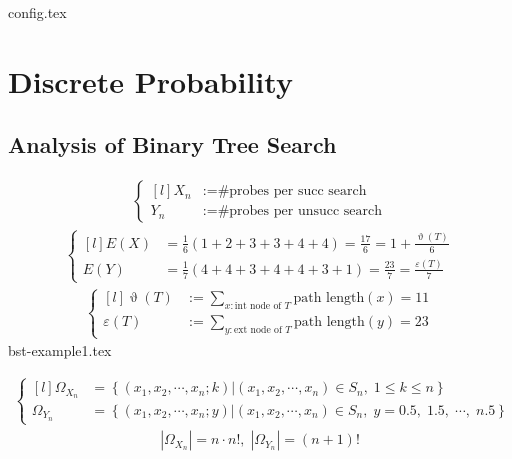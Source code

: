 \documentclass[12pt,a4paper,oneside]{report}
\begin{document}
{config.tex}

\fi

\setcounter{chapter}{7}
\chapter{Discrete Probability}


\section{Analysis of Binary Tree Search}

\begin{align*}
	\left\{\begin{matrix*}[l]
		X_n &:= \text{\# probes per succ search} \\
		Y_n &:= \text{\# probes per unsucc search}
	\end{matrix*}\right.
\end{align*}
\begin{align*}
	\left\{\begin{matrix*}[l]
		E(X) &= \frac{1}{6} \left(1+2+3+3+4+4\right) = \frac{17}{6} = 1 + \frac{\upvartheta(T)}{6} \\
		E(Y) &= \frac{1}{7} \left(4+4+3+4+4+3+1\right) = \frac{23}{7} = \frac{\varepsilon(T)}{7}
	\end{matrix*}\right.
\end{align*}
\begin{align*}
	\left\{\begin{matrix*}[l]
		\upvartheta(T) &:= \sum_{x : \text{int node of } T} \text{path length}(x) = 11\\
		\varepsilon(T) &:= \sum_{y : \text{ext node of } T} \text{path length}(y) = 23
	\end{matrix*}\right.
\end{align*}
{bst-example1.tex}

\begin{align*}
	\left\{\begin{matrix*}[l]
		\Omega_{X_n} &= \left\{(x_1, x_2, \cdots, x_n; k) | 
				(x_1, x_2, \cdots, x_n) \in S_n, \; 1 \le k \le n
		\right\} \\
		\Omega_{Y_n} &= \left\{(x_1, x_2, \cdots, x_n; y) | 
				(x_1, x_2, \cdots, x_n) \in S_n, \; y = 0.5, \; 1.5, \; \cdots, \; n.5
		\right\}
	\end{matrix*}\right. 
\end{align*}
\begin{align*}
|\Omega_{X_n}| = n \cdot n! , \; |\Omega_{Y_n}| = (n+1)!
\end{align*}
\end{document}
